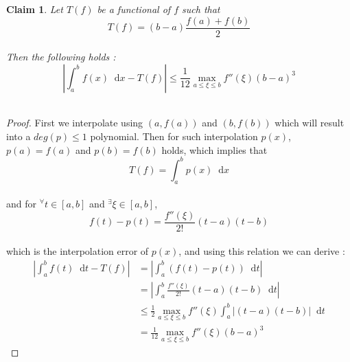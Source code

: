 \documentclass[paper=a4, fontsize=11pt]{scrartcl}
\newcommand*\dif{\mathop{}\!\mathrm{d}}
\newtheorem{claim}{Claim}
\begin{document}
\begin{claim}
	Let $T(f)$ be a functional of $f$ such that \\
	
	\begin{equation}\nonumber
		T(f) = (b-a)\frac{f(a)+f(b)}{2}
	\end{equation}\\
	
	Then the following holds : \\
	
	\begin{equation}\nonumber
		\left|\int_{a}^{b} f(x) \dif x  - T(f) \right| \leq \frac{1}{12} \max_{a\leq\xi\leq b} f''(\xi)(b-a)^3
	\end{equation}\\
\end{claim}

\begin{proof}
	First we interpolate using $(a,f(a))$ and $(b,f(b))$ which will result into a $deg(p) \leq 1$ polynomial. Then for such interpolation $p(x)$, $p(a)=f(a)$ and $p(b)=f(b)$ holds, which implies that \\
	
	\begin{equation}\nonumber
		T(f) = \int_{a}^{b} p(x) \dif x
	\end{equation}\\
	
	and for $^\forall t \in [a,b]$ and $^\exists \xi \in [a,b]$,\\
	
	\begin{equation}\nonumber
		f(t)-p(t) = \frac{f''(\xi)}{2!}(t-a)(t-b)
	\end{equation}\\
	
	which is the interpolation error of $p(x)$, and using this relation we can derive :\\
	
	\begin{equation}\nonumber
		\begin{split}
		\left|\int_{a}^{b} f(t) \dif t  - T(f) \right| &= \left|\int_{a}^{b} (f(t) - p(t)) \dif t \right| \\[2.5ex]
		&= \left|\int_{a}^{b} \frac{f''(\xi)}{2!}(t-a)(t-b)\dif t \right| \\[2.5ex]
		&\leq \frac{1}{2}  \max_{a\leq\xi\leq b} f''(\xi) \int_{a}^{b} \left|(t-a)(t-b) \right| \dif t \\[2.5ex]
		&= \frac{1}{12} \max_{a\leq\xi\leq b} f''(\xi)(b-a)^3 
		\end{split}
	\end{equation}
\end{proof}
\end{document}
